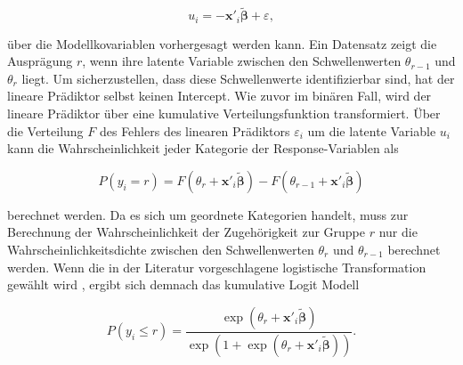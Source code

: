 \documentclass{Vorlage}
\begin{document}
\begin{equation}
u_i=-\mathbf{x}'_i \boldsymbol{\tilde{\beta}}+\varepsilon,
\end{equation}

über die Modellkovariablen vorhergesagt werden kann. Ein Datensatz zeigt die Ausprägung $r$, wenn ihre latente Variable zwischen den Schwellenwerten $\theta_{r-1}$ und $\theta_r$ liegt. Um sicherzustellen, dass diese Schwellenwerte identifizierbar sind, hat der lineare Prädiktor selbst keinen Intercept. Wie zuvor im binären Fall, wird der lineare Prädiktor über eine kumulative Verteilungsfunktion transformiert. Über die Verteilung $F$ des Fehlers des linearen Prädiktors  $\varepsilon_i$ um die latente Variable $u_i$ kann die Wahrscheinlichkeit jeder Kategorie der Response-Variablen als 

\begin{equation}
P(y_i=r)=F(\theta_r+\mathbf{x}'_i \boldsymbol{\tilde{\beta}})-F(\theta_{r-1}+\mathbf{x}'_i \boldsymbol{\tilde{\beta}})
\end{equation}

berechnet werden. Da es sich um geordnete Kategorien handelt, muss zur Berechnung der Wahrscheinlichkeit der Zugehörigkeit zur Gruppe $r$ nur die Wahrscheinlichkeitsdichte zwischen den Schwellenwerten $\theta_{r}$ und $\theta_{r-1}$ berechnet werden. Wenn die in der Literatur vorgeschlagene logistische Transformation gewählt wird \cite[p. 335]{fahrmeir2013regression}, ergibt sich demnach das kumulative Logit Modell

\begin{equation}
P(y_i\leq r)=\frac{\exp(\theta_r+\mathbf{x}'_i \boldsymbol{\tilde{\beta}})}{\exp(1+\exp(\theta_r+\mathbf{x}'_i \boldsymbol{\tilde{\beta}}))}.
\end{equation}
\end{document}
